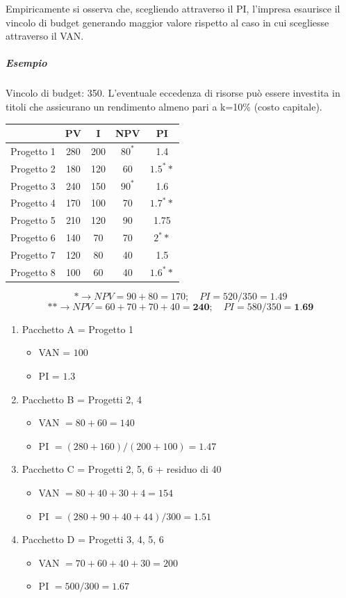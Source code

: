 Empiricamente si osserva che, scegliendo
attraverso il PI, l’impresa esaurisce il vincolo di
budget generando maggior valore rispetto al caso
in cui scegliesse attraverso il VAN.

\subparagraph{Esempio} Vincolo di budget: 350. L’eventuale eccedenza di risorse può essere investita in titoli che assicurano un
rendimento almeno pari a k=10\% (costo capitale).

\vspace{1em}
\begin{tabular}{|c|c|c|c|c|}
	\hline
	\grayrow & PV & I & NPV & PI \\
	\hline
	 Progetto 1 & 280 & 200 & $80^*$ & 1.4 \\
	 Progetto 2 & 180 & 120 & 60 & $1.5^**$ \\
	\hline
	 Progetto 3 & 240 & 150 & $90^*$ & 1.6 \\
	 Progetto 4 & 170 & 100 & 70 & $1.7^**$ \\
	\hline
	 Progetto 5 & 210 & 120 & 90 & 1.75 \\
	 Progetto 6 & 140 & 70 & 70 & $2^**$ \\
	\hline
	 Progetto 7 & 120 & 80 & 40 & 1.5 \\
	 Progetto 8 & 100 & 60 & 40 & $1.6^**$ \\
	\hline
\end{tabular}

\[
* \rightarrow NPV = 90+80=170; \quad PI = 520/350=1.49
\]
\[
** \rightarrow NPV = 60+70+70+40=\textbf{240}; \quad PI = 580/350 = \textbf{1.69}
\]

\begin{enumerate}
	\item Pacchetto A = Progetto 1
	\begin{itemize}
		\item VAN = $100$
		\item PI = $1.3$
	\end{itemize}
	\item Pacchetto B = Progetti 2, 4
	\begin{itemize}
		\item VAN $= 80 + 60 = 140$
		\item PI $= (280 + 160) / (200 + 100) = 1.47$
	\end{itemize}
	\item Pacchetto C = Progetti 2, 5, 6 + residuo di 40
	\begin{itemize}
		\item VAN $= 80 + 40 + 30 + 4 = 154$
		\item PI $= (280 + 90 + 40 + 44) / 300 = 1.51$
	\end{itemize}
	\item Pacchetto D = Progetti 3, 4, 5, 6
	\begin{itemize}
		\item VAN $= 70 + 60 + 40 + 30 = 200$
		\item PI $= 500 / 300 = 1.67$
	\end{itemize}
\end{enumerate}

